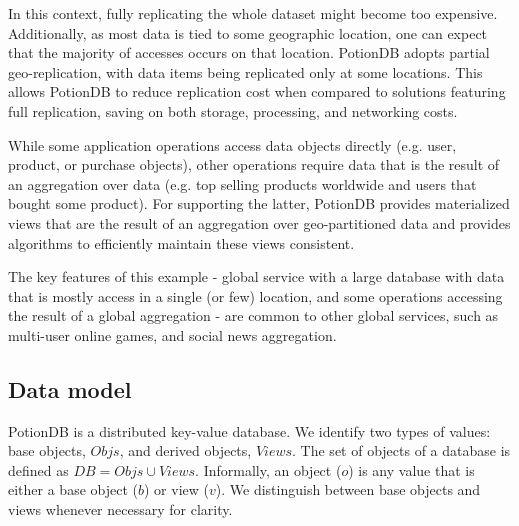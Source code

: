 \documentclass[sigplan,review,anonymous]{acmart}
\begin{document}
In this context, fully replicating the whole dataset might become too expensive.
Additionally, as most data is tied to some geographic location, one can expect that the majority of accesses
occurs on that location. 
PotionDB adopts partial geo-replication, with data items being replicated only at some locations.
This allows PotionDB to reduce replication cost when
compared to solutions featuring full replication, saving on both storage, processing, and networking costs.

While some application operations access data objects directly (e.g. user, product, or purchase objects),
other operations require data that is the result of an aggregation over  data (e.g.  top
selling products worldwide and users that bought some product).  For supporting the latter, %
PotionDB provides materialized views that are the result of an aggregation 
over geo-partitioned data and provides algorithms to efficiently maintain these views consistent.

The key features of this example - global service with a large database with
data that is mostly access in a single (or few) location,  and some operations accessing the result
of a global aggregation - are common to other global services, such as multi-user online games, and
social news aggregation.



\subsection{Data model}
\label{subsec:datamodel}

PotionDB is a distributed key-value database.
We identify two types of values: base objects, $\mathit{Objs}$, and derived objects, $\mathit{Views}$.
The set of objects of a database is defined as $\mathit{DB} = \mathit{Objs} \cup \mathit{Views}$.
Informally, an object ($o$) is any value that is either a base object ($b$) or view ($v$).
We distinguish between base objects and views whenever necessary for clarity.
\end{document}
